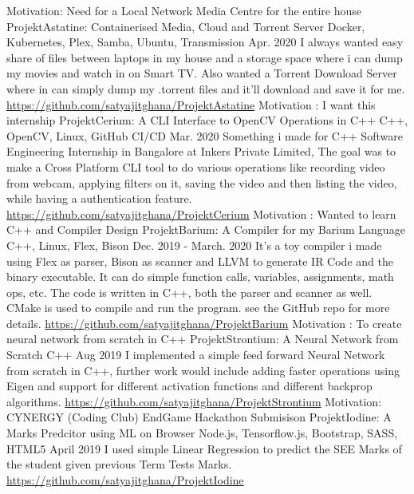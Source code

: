 \begin{cventries}
    \cventry
        {Motivation: Need for a Local Network Media Centre for the entire house}
        {ProjektAstatine: Containerised Media, Cloud and Torrent Server}
        {Docker, Kubernetes, Plex, Samba, Ubuntu, Transmission}
        {Apr. 2020}
        {
            I always wanted easy share of files between laptops in my house and a storage space where i can dump my movies and watch in on Smart TV.
            Also wanted a Torrent Download Server where in can simply dump my .torrent files and it'll download and save it for me.
            \url{https://github.com/satyajitghana/ProjektAstatine}
        }
    \cventry
        {Motivation : I want this internship}
        {ProjektCerium: A CLI Interface to OpenCV Operations in C++}
        {C++, OpenCV, Linux, GitHub CI/CD}
        {Mar. 2020}
        {Something i made for C++ Software Engineering Internship in Bangalore at Inkers Private Limited,
        The goal was to make a Cross Platform CLI tool to do various operations like recording video from webcam, applying filters on it, saving the video and then listing the video, while having a authentication feature.
        \url{https://github.com/satyajitghana/ProjektCerium}
        }
    \cventry
        {Motivation : Wanted to learn C++ and Compiler Design}
        {ProjektBarium: A Compiler for my Barium Language}
        {C++, Linux, Flex, Bison}
        {Dec. 2019 - March. 2020}
        {
        It's a toy compiler i made using Flex as parser, Bison as scanner and LLVM to generate IR Code and the binary executable. It can do simple function calls, variables, assignments, math ops, etc. The code is written in C++, both the parser and scanner as well. CMake is used to compile and run the program. see the GitHub repo for more details.
        \url{https://github.com/satyajitghana/ProjektBarium}
        }
    \cventry
        {Motivation : To create neural network from scratch in C++}
        {ProjektStrontium: A Neural Network from Scratch}
        {C++}
        {Aug 2019}
        {
        I implemented a simple feed forward Neural Network from scratch in C++, further work would include adding faster operations using Eigen and support for different activation functions and different backprop algorithms.
        \url{https://github.com/satyajitghana/ProjektStrontium}
        }
    \cventry
        {Motivation: CYNERGY (Coding Club) EndGame Hackathon Submisison}
        {ProjektIodine: A Marks Predcitor using ML on Browser}
        {Node.js, Tensorflow.js, Bootstrap, SASS, HTML5}
        {April 2019}
        {
            I used simple Linear Regression to predict the SEE Marks of the student given previous Term Tests Marks.
            \url{https://github.com/satyajitghana/ProjektIodine}
        }
\end{cventries}
